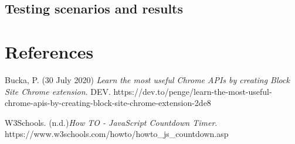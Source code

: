 \documentclass[12pt]{article}
\begin{document}
\subsection{Testing scenarios and results}

\section{References}

\begingroup
\renewcommand{\section}[2]{}
\begin{thebibliography}{10}
    Bucka, P. (30 July 2020) \textit{Learn the most useful Chrome APIs by creating Block Site Chrome extension}. 
    DEV. https://dev.to/penge/learn-the-most-useful-chrome-apis-by-creating-block-site-chrome-extension-2de8
    
    W3Schools. (n.d.)\textit{How TO - JavaScript Countdown Timer}. https://www.w3schools.com/howto/howto_js_countdown.asp
    
    \bigskip
\end{thebibliography}
\endgroup
\end{document}
